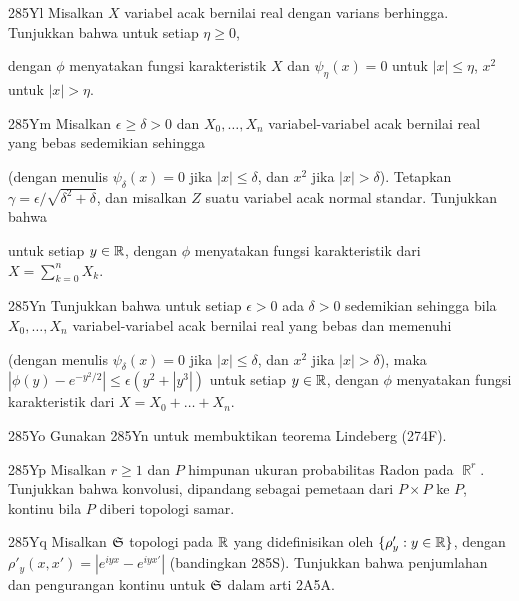 {\spheader 285Yl Misalkan $X$ variabel acak bernilai real dengan varians
berhingga. Tunjukkan bahwa untuk setiap $\eta\ge 0$,


\noindent dengan $\phi$ menyatakan fungsi karakteristik $X$ dan
$\psi_{\eta}(x)=0$ untuk $|x|\le\eta$, $x^2$ untuk $|x|>\eta$.

\spheader 285Ym Misalkan $\epsilon\ge\delta>0$ dan
$X_0,\ldots,X_n$ variabel-variabel acak bernilai real yang bebas sedemikian
sehingga


\noindent (dengan menulis $\psi_{\delta}(x)=0$ jika $|x|\le\delta$, dan $x^2$
jika $|x|>\delta$). Tetapkan $\gamma=\epsilon/\sqrt{\delta^2+\delta}$, dan
misalkan $Z$ suatu variabel acak normal standar. Tunjukkan bahwa


\noindent untuk setiap $y\in\Bbb R$, dengan $\phi$ menyatakan fungsi
karakteristik dari $X=\sum_{k=0}^nX_k$.

\spheader 285Yn Tunjukkan bahwa untuk setiap $\epsilon>0$ ada
$\delta>0$ sedemikian sehingga bila $X_0,\ldots,X_n$ variabel-variabel acak
bernilai real yang bebas dan memenuhi


\noindent (dengan menulis $\psi_{\delta}(x)=0$ jika $|x|\le\delta$, dan $x^2$
jika $|x|>\delta$), maka
$|\phi(y)-e^{-y^2/2}|\le\epsilon(y^2+|y^3|)$ untuk setiap $y\in\Bbb R$,
dengan $\phi$ menyatakan fungsi karakteristik dari $X=X_0+\ldots+X_n$.

\spheader 285Yo Gunakan 285Yn untuk membuktikan teorema Lindeberg (274F).

\spheader 285Yp Misalkan $r\ge 1$ dan $P$ himpunan ukuran probabilitas Radon
pada $\BbbR^r$. Tunjukkan bahwa konvolusi, dipandang sebagai pemetaan dari
$P\times P$ ke $P$, kontinu bila $P$ diberi topologi samar.

\spheader 285Yq Misalkan $\frak S$ topologi pada $\Bbb R$ yang didefinisikan
oleh $\{\rho'_y:y\in\Bbb R\}$, dengan
$\rho'_y(x,x')=|e^{iyx}-e^{iyx'}|$ (bandingkan 285S). Tunjukkan bahwa
penjumlahan dan pengurangan kontinu untuk $\frak S$ dalam arti 2A5A.

}
